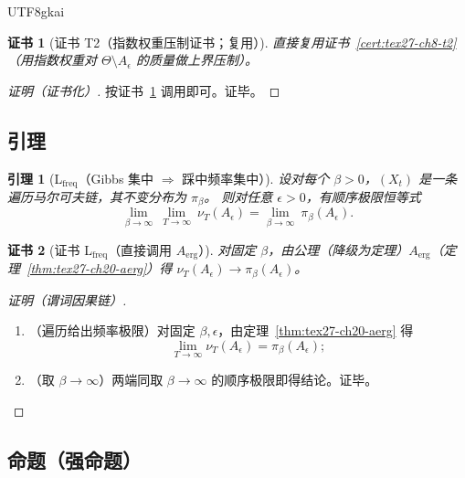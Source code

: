 \documentclass[12pt]{article}
\newtheorem{lemma}{引理}[section]
\newtheorem{Certificate}{证书}[section]
\begin{document}
\begin{CJK*}{UTF8}{gkai}
\begin{Certificate}[证书 T2（指数权重压制证书；复用）]
\label{cert:tex27-ch20-t2}
直接复用证书~\ref{cert:tex27-ch8-t2}（用指数权重对 $\Theta\setminus A_\epsilon$ 的质量做上界压制）。
\end{Certificate}

\begin{proof}[证明（证书化）]
按证书~\ref{cert:tex27-ch20-t2} 调用即可。证毕。
\end{proof}

\subsection{引理}
\label{subsec:tex27-ch20-lemmas}

\begin{lemma}[L$_{\mathrm{freq}}$（Gibbs 集中 $\Rightarrow$ 踩中频率集中）]
\label{lem:tex27-ch20-lfreq}
设对每个 $\beta>0$，$(X_t)$ 是一条遍历马尔可夫链，其不变分布为 $\pi_\beta$。
则对任意 $\epsilon>0$，有顺序极限恒等式
\[
  \lim_{\beta\to\infty}\ \lim_{T\to\infty}\ \nu_T(A_\epsilon)
  =
  \lim_{\beta\to\infty}\ \pi_\beta(A_\epsilon).
\]
\end{lemma}

\begin{Certificate}[证书 L$_{\mathrm{freq}}$（直接调用 $A_{\mathrm{erg}}$）]
\label{cert:tex27-ch20-lfreq}
对固定 $\beta$，由公理（降级为定理）$A_{\mathrm{erg}}$（定理~\ref{thm:tex27-ch20-aerg}）得 $\nu_T(A_\epsilon)\to\pi_\beta(A_\epsilon)$。
\end{Certificate}

\begin{proof}[证明（谓词因果链）]
\begin{enumerate}
  \item（遍历给出频率极限）对固定 $\beta,\epsilon$，由定理~\ref{thm:tex27-ch20-aerg} 得
  \[
    \lim_{T\to\infty}\nu_T(A_\epsilon)=\pi_\beta(A_\epsilon);
  \]
  \item（取 $\beta\to\infty$）两端同取 $\beta\to\infty$ 的顺序极限即得结论。证毕。
\end{enumerate}
\end{proof}

\subsection{命题（强命题）}
\label{subsec:tex27-ch20-props}


\end{CJK*}
\end{document}
